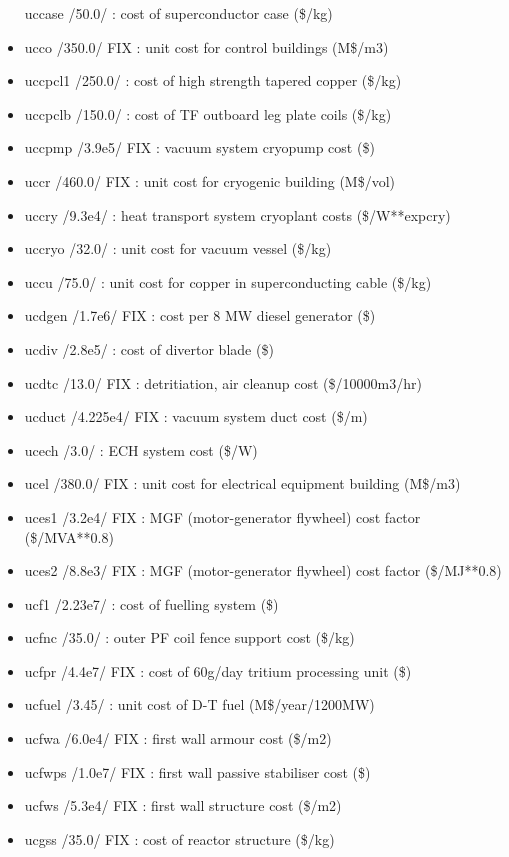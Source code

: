 \documentclass[]{article}
\begin{document}
\begin{itemize}
  uccase /50.0/ : cost of superconductor case (\$/kg)
\item
  ucco /350.0/ FIX : unit cost for control buildings (M\$/m3)
\item
  uccpcl1 /250.0/ : cost of high strength tapered copper (\$/kg)
\item
  uccpclb /150.0/ : cost of TF outboard leg plate coils (\$/kg)
\item
  uccpmp /3.9e5/ FIX : vacuum system cryopump cost (\$)
\item
  uccr /460.0/ FIX : unit cost for cryogenic building (M\$/vol)
\item
  uccry /9.3e4/ : heat transport system cryoplant costs (\$/W**expcry)
\item
  uccryo /32.0/ : unit cost for vacuum vessel (\$/kg)
\item
  uccu /75.0/ : unit cost for copper in superconducting cable (\$/kg)
\item
  ucdgen /1.7e6/ FIX : cost per 8 MW diesel generator (\$)
\item
  ucdiv /2.8e5/ : cost of divertor blade (\$)
\item
  ucdtc /13.0/ FIX : detritiation, air cleanup cost (\$/10000m3/hr)
\item
  ucduct /4.225e4/ FIX : vacuum system duct cost (\$/m)
\item
  ucech /3.0/ : ECH system cost (\$/W)
\item
  ucel /380.0/ FIX : unit cost for electrical equipment building
  (M\$/m3)
\item
  uces1 /3.2e4/ FIX : MGF (motor-generator flywheel) cost factor
  (\$/MVA**0.8)
\item
  uces2 /8.8e3/ FIX : MGF (motor-generator flywheel) cost factor
  (\$/MJ**0.8)
\item
  ucf1 /2.23e7/ : cost of fuelling system (\$)
\item
  ucfnc /35.0/ : outer PF coil fence support cost (\$/kg)
\item
  ucfpr /4.4e7/ FIX : cost of 60g/day tritium processing unit (\$)
\item
  ucfuel /3.45/ : unit cost of D-T fuel (M\$/year/1200MW)
\item
  ucfwa /6.0e4/ FIX : first wall armour cost (\$/m2)
\item
  ucfwps /1.0e7/ FIX : first wall passive stabiliser cost (\$)
\item
  ucfws /5.3e4/ FIX : first wall structure cost (\$/m2)
\item
  ucgss /35.0/ FIX : cost of reactor structure (\$/kg)

\end{itemize}
\end{document}
